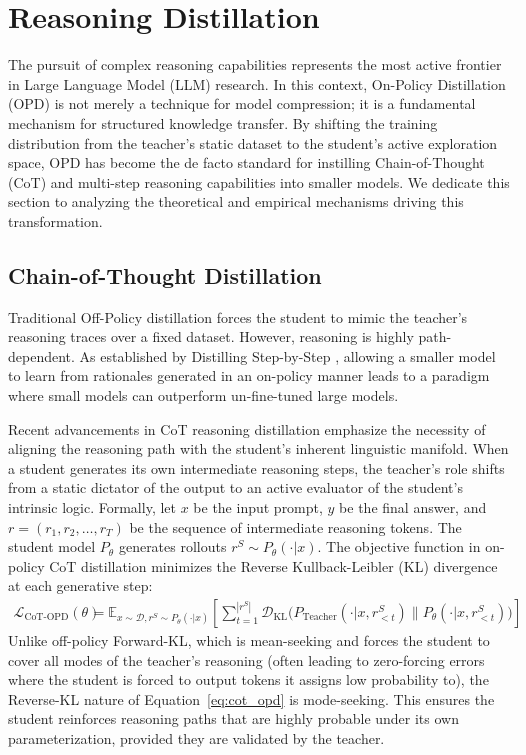 \section{Reasoning Distillation}
\label{sec:reasoning}

The pursuit of complex reasoning capabilities represents the most active frontier in Large Language Model (LLM) research. In this context, On-Policy Distillation (OPD) is not merely a technique for model compression; it is a fundamental mechanism for structured knowledge transfer. By shifting the training distribution from the teacher's static dataset to the student's active exploration space, OPD has become the de facto standard for instilling Chain-of-Thought (CoT) and multi-step reasoning capabilities into smaller models. We dedicate this section to analyzing the theoretical and empirical mechanisms driving this transformation.

\subsection{Chain-of-Thought Distillation}
Traditional Off-Policy distillation forces the student to mimic the teacher's reasoning traces over a fixed dataset. However, reasoning is highly path-dependent. As established by Distilling Step-by-Step \citep{2305.02301}, allowing a smaller model to learn from rationales generated in an on-policy manner leads to a paradigm where small models can outperform un-fine-tuned large models. 

Recent advancements in CoT reasoning distillation \citep{2402.00857, 2405.04434} emphasize the necessity of aligning the reasoning path with the student's inherent linguistic manifold. When a student generates its own intermediate reasoning steps, the teacher's role shifts from a static dictator of the output to an active evaluator of the student's intrinsic logic. Formally, let $x$ be the input prompt, $y$ be the final answer, and $r = (r_1, r_2, \dots, r_T)$ be the sequence of intermediate reasoning tokens. The student model $P_\theta$ generates rollouts $r^S \sim P_\theta(\cdot | x)$. The objective function in on-policy CoT distillation minimizes the Reverse Kullback-Leibler (KL) divergence at each generative step:
\begin{align}
\mathcal{L}_{\text{CoT-OPD}}(\theta) &= \mathbb{E}_{x \sim \mathcal{D}, r^S \sim P_\theta(\cdot|x)} \left[ \sum_{t=1}^{|r^S|} \mathcal{D}_{\text{KL}} \Big( P_{\text{Teacher}}(\cdot | x, r^S_{<t}) \parallel P_\theta(\cdot | x, r^S_{<t}) \Big) \right] \label{eq:cot_opd}
\end{align}
Unlike off-policy Forward-KL, which is mean-seeking and forces the student to cover all modes of the teacher's reasoning (often leading to zero-forcing errors where the student is forced to output tokens it assigns low probability to), the Reverse-KL nature of Equation~\ref{eq:cot_opd} is mode-seeking. This ensures the student reinforces reasoning paths that are highly probable under its own parameterization, provided they are validated by the teacher.

